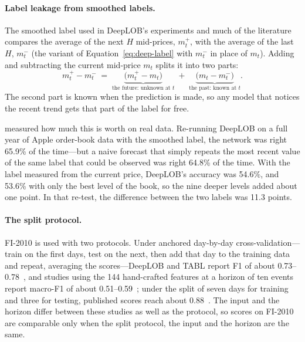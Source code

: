 \paragraph{Label leakage from smoothed labels.} The smoothed label used in DeepLOB's experiments and much of
the literature compares the average of the next $H$ mid-prices, $m^+_t$, with the average of the last $H$,
$m^-_t$ (the variant of Equation~\eqref{eq:deep-label} with $m^-_t$ in place of $m_t$). Adding and subtracting
the current mid-price $m_t$ splits it into two parts:
\begin{equation}
m^+_t - m^-_t \;=\; \underbrace{\big(m^+_t - m_t\big)}_{\text{the future: unknown at } t}
\;+\; \underbrace{\big(m_t - m^-_t\big)}_{\text{the past: known at } t}.
\label{eq:label-leak}
\end{equation}
The second part is known when the prediction is made, so any model that notices the recent trend gets that part
of the label for free.


\citet{lee2024predictability} measured how much this is worth on real data. Re-running DeepLOB on a full year of Apple
order-book data with the smoothed label, the network was right 65.9\% of the time---but a naive forecast that
simply repeats the most recent value of the same label that could be observed was right 64.8\% of the time. With
the label measured from the current price, DeepLOB's accuracy was 54.6\%, and 53.6\% with only the best
level of the book, so the nine deeper levels added about one point. In that re-test, the difference between the
two labels was 11.3 points.

\paragraph{The split protocol.} FI-2010 is used with two protocols. Under anchored day-by-day cross-validation---train on
the first days, test on the next, then add that day to the training data and repeat, averaging the scores---DeepLOB
and TABL report F1 of about 0.73--0.78~\citep{zhang2019,tran2019tabl}, and studies using the 144 hand-crafted
features at a horizon of ten events report macro-F1 of about 0.51--0.59~\citep{september2024edain,passalis2020tlonbof};
under the split of seven days for training and three for testing, published scores reach about
0.88~\citep{tran2021bin}. The input and the horizon differ between these studies as well as the protocol, so scores
on FI-2010 are comparable only when the split protocol, the input and the horizon are the same.

